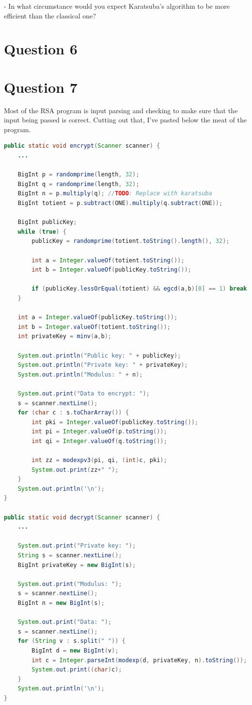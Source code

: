 \documentclass[journal,a4paper]{IEEEtran}
\begin{document}
- In what circumstance would you expect Karatsuba’s algorithm to be more efficient than the classical one?

\section*{Question 6}


\section*{Question 7}
Most of the RSA program is input parsing and checking to make sure that the input being passed is correct. Cutting out that, I've pasted below the meat of the program.
\begin{lstlisting}[language=Java]
public static void encrypt(Scanner scanner) {
	...
	
	BigInt p = randomprime(length, 32);
	BigInt q = randomprime(length, 32);
	BigInt n = p.multiply(q); //TODO: Replace with karatsuba
	BigInt totient = p.subtract(ONE).multiply(q.subtract(ONE));

	BigInt publicKey;
	while (true) {
		publicKey = randomprime(totient.toString().length(), 32);

		int a = Integer.valueOf(totient.toString());
		int b = Integer.valueOf(publicKey.toString());

		if (publicKey.lessOrEqual(totient) && egcd(a,b)[0] == 1) break;
	}

	int a = Integer.valueOf(publicKey.toString());
	int b = Integer.valueOf(totient.toString());
	int privateKey = minv(a,b);

	System.out.println("Public key: " + publicKey);
	System.out.println("Private key: " + privateKey);
	System.out.println("Modulus: " + n);

	System.out.print("Data to encrypt: ");
	s = scanner.nextLine();
	for (char c : s.toCharArray()) {
		int pki = Integer.valueOf(publicKey.toString());
		int pi = Integer.valueOf(p.toString());
		int qi = Integer.valueOf(q.toString());

		int zz = modexpv3(pi, qi, (int)c, pki);
		System.out.print(zz+" ");
	}
	System.out.println('\n');
}

public static void decrypt(Scanner scanner) {
	...
	
	System.out.print("Private key: ");
	String s = scanner.nextLine();
	BigInt privateKey = new BigInt(s);

	System.out.print("Modulus: ");
	s = scanner.nextLine();
	BigInt n = new BigInt(s);

	System.out.print("Data: ");
	s = scanner.nextLine();
	for (String v : s.split(" ")) {
		BigInt d = new BigInt(v);
		int c = Integer.parseInt(modexp(d, privateKey, n).toString());
		System.out.print((char)c);
	}
	System.out.println('\n');
}
\end{lstlisting}
\end{document}
